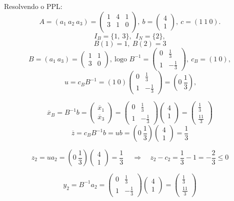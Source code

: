 \documentclass[12pt]{exam}
\begin{document}
\begin{questions}
\begin{solution}
Resolvendo o PPL:
	$$A = (a_1~a_2~a_3) =\begin{pmatrix}
	1 & 4 & 1  \\ 
	3 & 1 & 0  \\ 
	\end{pmatrix},~
	b = \begin{pmatrix}
	4 \\ 
	1
	\end{pmatrix},~c = (1~1~0).$$
	$$I_B = \{1,~3\},~~I_N = \{2\},$$
	$$B(1) = 1,~ B(2) = 3$$
	$$B = (a_1~a_3) =\begin{pmatrix}
	1 & 1 \\
	3 & 0
	\end{pmatrix},~\text{logo } B^{-1} = \begin{pmatrix}
	0 & \frac{1}{3} \\
	1 & -\frac{1}{3}
	\end{pmatrix},~c_B = (1~0),$$
	$$~u = c_BB^{-1} = (1~0)\begin{pmatrix}
	0 & \frac{1}{3} \\
	1 & -\frac{1}{3}
	\end{pmatrix} = (0~\frac{1}{3}),$$
	
	$$ \overline{x}_B =B^{-1}b = \begin{pmatrix}
	\overline{x}_1 \\ 
	\overline{x}_3 
	\end{pmatrix} = \begin{pmatrix}
	0 & \frac{1}{3} \\
	1 & -\frac{1}{3}
	\end{pmatrix} \begin{pmatrix}
	4 \\ 
	1 \\ 
	\end{pmatrix} = \begin{pmatrix}
	\frac{1}{3} \\ 
	\frac{11}{3} 
	\end{pmatrix}$$
	$$\overline{z} = c_BB^{-1}b = ub = (0~\frac{1}{3}) \begin{pmatrix}
	4 \\ 
	1 
	\end{pmatrix} = \frac{1}{3}$$

	$$z_2 = ua_2 = (0~\frac{1}{3})\begin{pmatrix}
	4 \\ 
	1 
	\end{pmatrix} = \frac{1}{3}~\quad \Rightarrow \quad z_2 - c_2 = \frac{1}{3} - 1 = -\frac{2}{3} \leq 0$$


	$$y_2 = B^{-1}a_2 = \begin{pmatrix}
	0 & \frac{1}{3} \\
	1 & -\frac{1}{3}
	\end{pmatrix} \begin{pmatrix}
	4 \\ 
	1
	\end{pmatrix}=  \begin{pmatrix}
	\frac{1}{3} \\ 
	\frac{11}{3} 
	\end{pmatrix} $$


\end{solution}
\end{questions}
\end{document}
